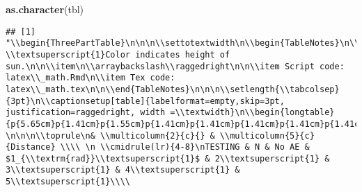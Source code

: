 \documentclass[]{article}
\newenvironment{Shaded}{\begin{snugshade}}{\end{snugshade}}
\newcommand{\KeywordTok}[1]{\textcolor[rgb]{0.13,0.29,0.53}{\textbf{#1}}}
\newcommand{\NormalTok}[1]{#1}
\def\settotextwidth{\renewcommand\TPTminimum{\textwidth}}
\begin{document}
\begin{Shaded}
\begin{Highlighting}[]
\KeywordTok{as.character}\NormalTok{(tbl)}
\end{Highlighting}
\end{Shaded}

\begin{verbatim}
## [1] "\\begin{ThreePartTable}\n\n\n\\settotextwidth\n\\begin{TableNotes}\n\\setlength\\labelsep{0pt}\n\\footnotesize\n\\arraybackslash\\raggedright\n\n\\item \\textsuperscript{1}Color indicates height of sun.\n\n\\item\n\\arraybackslash\\raggedright\n\n\\item Script code: latex\\_math.Rmd\n\\item Tex code: latex\\_math.tex\n\n\\end{TableNotes}\n\n\n\\setlength{\\tabcolsep}{3pt}\n\\captionsetup[table]{labelformat=empty,skip=3pt, justification=raggedright, width =\\textwidth}\n\\begin{longtable}{p{5.65cm}p{1.41cm}p{1.55cm}p{1.41cm}p{1.41cm}p{1.41cm}p{1.41cm}p{1.41cm}} \n\n\n\\toprule\n& \\multicolumn{2}{c}{} & \\multicolumn{5}{c}{Distance} \\\\ \n \\cmidrule(lr){4-8}\nTESTING & N & No AE & $1_{\\textrm{rad}}\\textsuperscript{1}$ & 2\\textsuperscript{1} & 3\\textsuperscript{1} & 4\\textsuperscript{1} & 5\\textsuperscript{1}\\\\ 
\end{verbatim}
\end{document}
